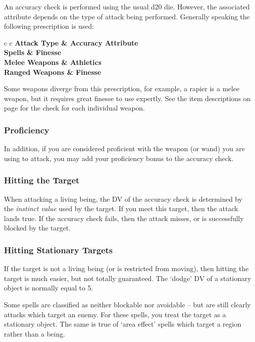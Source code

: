 An accuracy check is performed using the usual d20 die. However, the associated attribute depends on the type of attack being performed. Generally speaking the following prescription is used:

\begin{center}
\begin{rndtable}{c c}
\bf Attack Type	&	\bf Accuracy Attribute
\\
Spells	&	Finesse
\\
Melee Weapons	& Athletics
\\
Ranged Weapons	&	Finesse
\end{rndtable}
\end{center}

Some weapons diverge from this prescription, for example, a rapier is a melee weapon, but it requires great finesse to use expertly. See the item descriptions on page \pageref{S:WeaponList} for the check for each individual weapon. 

\subsubsection{Proficiency}

In addition, if you are considered proficient with the weapon (or wand) you are using to attack, you may add your proficiency bonus to the accuracy check. 

\subsubsection{Hitting the Target}

When attacking a living being, the DV of the accuracy check is determined by the {\it instinct value} used by the target. If you meet this target, then the attack lands true. If the accuracy check fails, then the attack misses, or is successfully blocked by the target. 

\subsubsection{Hitting Stationary Targets}

If the target is not a living being (or is restricted from moving), then hitting the target is much easier, but not totally guaranteed. The `dodge' DV of a stationary object is normally equal to 5. 

Some spells are classified as neither blockable nor avoidable -- but are still clearly attacks which target an enemy. For these spells, you treat the target as a stationary object. The same is true of `area effect' spells which target a region rather than a being. 

